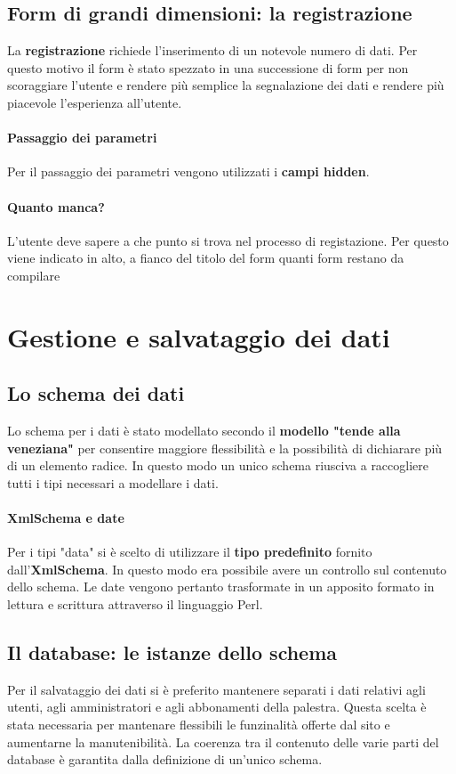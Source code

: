 \documentclass[12pt,a4paper]{article}
\begin{document}
\subsection{Form di grandi dimensioni: la registrazione} 
La \textbf{registrazione} richiede l'inserimento di un notevole numero di dati. Per questo motivo il form è stato spezzato in una successione di form per non scoraggiare l'utente e rendere più semplice la segnalazione dei dati e rendere più piacevole l'esperienza all'utente. 
\paragraph{Passaggio dei parametri} Per il passaggio dei parametri vengono utilizzati i \textbf{campi hidden}. 
\paragraph{Quanto manca?} L'utente deve sapere a che punto si trova nel processo di registazione. Per questo viene indicato in alto, a fianco del titolo del form quanti form restano da compilare
\section{Gestione e salvataggio dei dati}
\subsection{Lo schema dei dati}
Lo schema per i dati è stato modellato secondo il \textbf{modello "tende alla veneziana"} per consentire maggiore flessibilità e la possibilità di dichiarare più di un elemento radice.
In questo modo un unico schema riusciva a raccogliere tutti i tipi necessari a modellare i dati.

\paragraph{XmlSchema e date} Per i tipi "data" si è scelto di utilizzare il \textbf{tipo predefinito} fornito dall'\textbf{XmlSchema}. In questo modo era possibile avere un controllo sul contenuto dello schema. Le date vengono pertanto trasformate in un apposito formato in lettura e scrittura attraverso il linguaggio Perl. 
\subsection{Il database: le istanze dello schema}
Per il salvataggio dei dati si è preferito mantenere separati i dati relativi agli utenti, agli amministratori e agli abbonamenti della palestra. 
Questa scelta è stata necessaria per mantenare flessibili le funzinalità offerte dal sito e aumentarne la manutenibilità.
La coerenza tra il contenuto delle varie parti del database è garantita dalla definizione di un'unico schema. 
\end{document}
